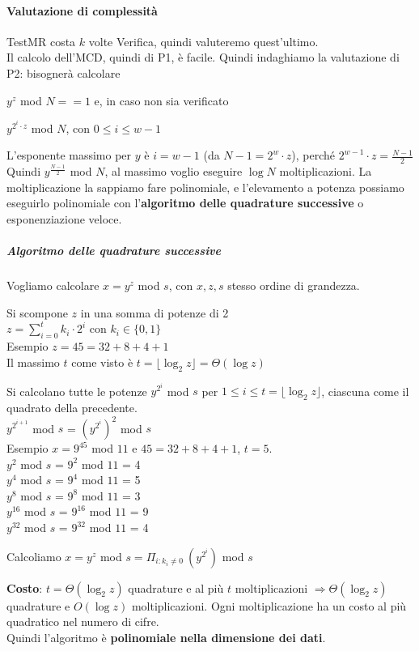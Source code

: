 \documentclass[10pt]{book}
\begin{document}
\paragraph{Valutazione di complessità} TestMR costa $k$ volte Verifica, quindi valuteremo quest'ultimo.\\
Il calcolo dell'MCD, quindi di P1, è facile. Quindi indaghiamo la valutazione di P2: bisognerà calcolare
\begin{list}{}{}
	\item $y^z$ mod $N == 1$ e, in caso non sia verificato
	\item $y^{2^i\cdot z}$ mod $N$, con $0 \leq i \leq w-1$
\end{list}
	L'esponente massimo per $y$ è $i = w-1$ (da $N-1 = 2^w \cdot z$), perché $2^{w-1}\cdot z = \frac{N-1}{2}$\\
Quindi $y^{\frac{N-1}{2}}$ mod $N$, al massimo voglio eseguire $\log N$ moltiplicazioni. La moltiplicazione la sappiamo fare polinomiale, e l'elevamento a potenza possiamo eseguirlo polinomiale con l'\textbf{algoritmo delle quadrature successive} o esponenziazione veloce.
\subparagraph{Algoritmo delle quadrature successive} Vogliamo calcolare $x = y^z$ mod $s$, con $x,z,s$ stesso ordine di grandezza.
\begin{list}{}{}
	\item Si scompone $z$ in una somma di potenze di 2\\
	$z = \sum_{i=0}^t k_i\cdot 2^i$ con $k_i\in\{0,1\}$\\
	Esempio $z = 45 = 32 + 8 + 4 + 1$\\
	Il massimo $t$ come visto è $t = \lfloor \log_2 z\rfloor = \Theta(\log z)$
	\item Si calcolano tutte le potenze $y^{2^i}$ mod $s$ per $1\leq i \leq t = \lfloor\log_2 z\rfloor$, ciascuna come il quadrato della precedente.\\
	$y^{2^{i+1}}$ mod $s$ = $\left(y^{2^i}\right)^2$ mod $s$\\
	Esempio $x = 9^{45}$ mod $11$ e $45 = 32 + 8 + 4 + 1$, $t = 5$.\\
	$y^2$ mod $s$ = $9^2$ mod $11$ = 4\\
	$y^4$ mod $s$ = $9^4$ mod $11$ = 5\\
	$y^8$ mod $s$ = $9^8$ mod $11$ = 3\\
	$y^{16}$ mod $s$ = $9^{16}$ mod $11$ = 9\\
	$y^{32}$ mod $s$ = $9^{32}$ mod $11$ = 4\\
	\item Calcoliamo $x = y^z$ mod $s = \Pi_{i:k_i\neq0}\:(y^{2^i})$ mod $s$ %
\end{list}
\textbf{Costo}: $t = \Theta(\log_2 z)$ quadrature e al più $t$ moltiplicazioni $\Rightarrow \Theta(\log_2 z)$ quadrature e $O(\log z)$ moltiplicazioni. Ogni moltiplicazione ha un costo al più quadratico nel numero di cifre.\\
Quindi l'algoritmo è \textbf{polinomiale nella dimensione dei dati}.
\end{document}
